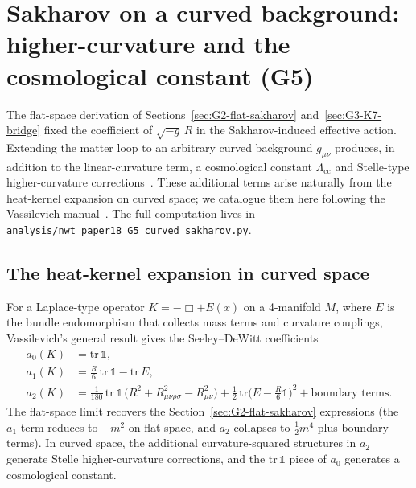 \documentclass[11pt]{article}
\begin{document}
\section{Sakharov on a curved background:
higher-curvature and the cosmological constant (G5)}
\label{sec:G5-curved}

The flat-space derivation of Sections~\ref{sec:G2-flat-sakharov}
and~\ref{sec:G3-K7-bridge} fixed the coefficient of $\sqrt{-g}\,R$
in the Sakharov-induced effective action.  Extending the matter
loop to an arbitrary curved background $g_{\mu\nu}$ produces, in
addition to the linear-curvature term, a cosmological constant
$\Lambda_{\mathrm{cc}}$ and Stelle-type higher-curvature
corrections~\cite{stelle1977}.  These additional terms arise
naturally from the heat-kernel expansion on curved space; we
catalogue them here following the Vassilevich
manual~\cite{vassilevich2003}.  The full computation lives in
\texttt{analysis/nwt\_paper18\_G5\_curved\_sakharov.py}.

\subsection{The heat-kernel expansion in curved space}

For a Laplace-type operator $K = -\Box + E(x)$ on a 4-manifold $M$,
where $E$ is the bundle endomorphism that collects mass terms and
curvature couplings, Vassilevich's general result
\cite{vassilevich2003} gives the Seeley--DeWitt coefficients
\begin{align}
  a_0(K) &= \mathrm{tr}\,\mathbb{1}, \\
  a_1(K) &= \tfrac{R}{6}\,\mathrm{tr}\,\mathbb{1} - \mathrm{tr}\,E, \\
  a_2(K) &= \tfrac{1}{180}\,\mathrm{tr}\,\mathbb{1}\,
            \bigl(R^2 + R_{\mu\nu\rho\sigma}^2 - R_{\mu\nu}^2\bigr)
          + \tfrac{1}{2}\,\mathrm{tr}\bigl(E - \tfrac{R}{6}\mathbb{1}\bigr)^2
          + \text{boundary terms}.
\end{align}
The flat-space limit recovers the Section~\ref{sec:G2-flat-sakharov}
expressions (the $a_1$ term reduces to $-m^2$ on flat space, and
$a_2$ collapses to $\tfrac{1}{2}m^4$ plus boundary terms).  In
curved space, the additional curvature-squared structures in $a_2$
generate Stelle higher-curvature corrections, and the
$\mathrm{tr}\,\mathbb{1}$ piece of $a_0$ generates a cosmological
constant.
\end{document}
